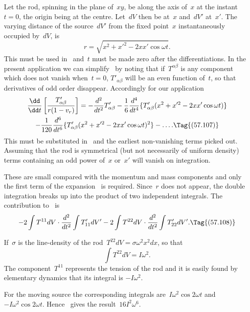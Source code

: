 \documentclass[12pt]{book}
\begin{document}
Let the rod, spinning in the plane of~$xy$, be along the axis of~$x$ at the instant~$t=0$, the origin being at
the centre.
Let~$dV$ then be at~$x$ and~$dV'$ at~$x'$.
The varying distance of the source~$dV'$ from the fixed point~$x$ instantaneously occupied by~$dV$, is
\[
r=\sqrt{x^2 + x'^2 - 2 x x' \cos\omega t}.
\]
This must be used in~ and~$t$ must be made zero after the differentiations.
In the present application we can simplify~ by noting that if~$T^{\alpha\beta}$ is any component
which does not vanish when~$t=0$, $T'_{\alpha\beta}$ will be an even function of~$t$,
so that derivatives of odd order disappear.
Accordingly for our application
\begin{multline*}
\frac{\dd}{\dd t}\left[\frac{T'_{\alpha\beta}}{r(1-v_r)}\right] = -\frac{d^2}{dt^2}T'_{\alpha\beta} -
                        \frac{1}{6}\frac{d^4}{dt^4}\{T'_{\alpha\beta}(x^2 + x'^2 - 2 x x' \cos\omega t)\}\\
                   -\frac{1}{120}\frac{d^6}{dt^6}\{T'_{\alpha\beta}(x^2 + x'^2 - 2 x x' \cos\omega t)^2\} - \ldots.
\Tag{(57.107)}
\end{multline*}
This must be substituted in~ and the earliest non\hyp{}vanishing terms picked out.
Assuming that the rod is symmetrical (but not necessarily of uniform density) terms containing an
odd power of~$x$ or~$x'$ will vanish on integration.


These are small compared with the momentum and mass components and only the first term of the expansion~
is required.
Since~$r$ does not appear, the double integration breaks up into the product of two independent integrals.
The contribution to~ is
\[
-2\int T^{11} dV \cdot \frac{d^2}{dt^2}\int T'_{11} dV' - 2\int T^{22} dV \cdot \frac{d^2}{dt^2}\int T'_{22} dV'.
\Tag{(57.108)}
\]

If~$\sigma$ is the line\hyp{}density of the rod~$T^{22} dV = \sigma\omega^2 x^2 dx$, so that
\[
\int T^{22} dV = I\omega^2.
\]
The component~$T^{11}$ represents the tension of the rod and it is easily found by elementary dynamics that its
integral is $-I\omega^2$.

For the moving source the corresponding integrals are~$I\omega^2\cos 2\omega t$ and~$-I\omega^2\cos 2\omega t$.
Hence~ gives the result~$16I^2\omega^6$.

\end{document}

